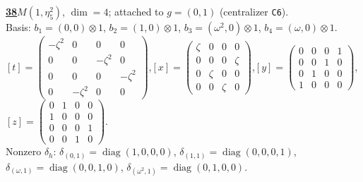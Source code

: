 \begin{samepage}\noindent\textbf{\underline{38}}\quad $M(1,\eta^{2}_{5})$, $\dim=4$; attached to $g=(0,1)$ (centralizer \texttt{C6}).\\
Basis: $b_{1}=(0,0)\otimes 1$, $b_{2}=(1,0)\otimes 1$, $b_{3}=(\omega^2,0)\otimes 1$, $b_{4}=(\omega,0)\otimes 1$.\\
$[t]=\left(\begin{smallmatrix} -\zeta^2 & 0 & 0 & 0 \\ 0 & 0 & -\zeta^2 & 0 \\ 0 & 0 & 0 & -\zeta^2 \\ 0 & -\zeta^2 & 0 & 0 \end{smallmatrix}\right)$,\quad $[x]=\left(\begin{smallmatrix} \zeta & 0 & 0 & 0 \\ 0 & 0 & 0 & \zeta \\ 0 & \zeta & 0 & 0 \\ 0 & 0 & \zeta & 0 \end{smallmatrix}\right)$,\quad $[y]=\left(\begin{smallmatrix} 0 & 0 & 0 & 1 \\ 0 & 0 & 1 & 0 \\ 0 & 1 & 0 & 0 \\ 1 & 0 & 0 & 0 \end{smallmatrix}\right)$,\quad $[z]=\left(\begin{smallmatrix} 0 & 1 & 0 & 0 \\ 1 & 0 & 0 & 0 \\ 0 & 0 & 0 & 1 \\ 0 & 0 & 1 & 0 \end{smallmatrix}\right)$.\\
Nonzero $\delta_h$: $\delta_{(0,1)}=\operatorname{diag}(1,0,0,0)$, $\delta_{(1,1)}=\operatorname{diag}(0,0,0,1)$, $\delta_{(\omega,1)}=\operatorname{diag}(0,0,1,0)$, $\delta_{(\omega^2,1)}=\operatorname{diag}(0,1,0,0)$.\end{samepage}
\medskip

